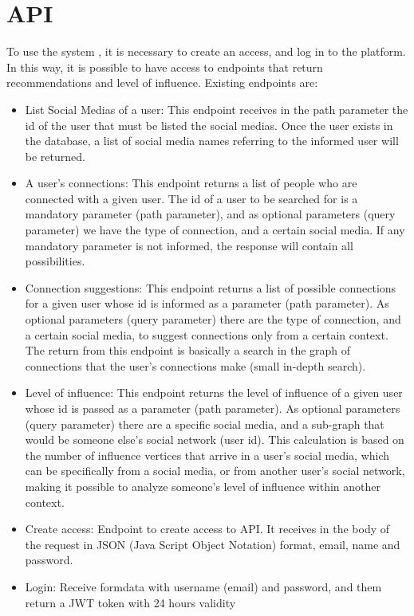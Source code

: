 
\section{API}
To use the system \cite{MetaSocialMediaAPI}, it is necessary to create an access, and log in to the platform. In this way, it is possible to have access to endpoints that return recommendations and level of influence. Existing endpoints are:
\begin{itemize}
    \item List Social Medias of a user: This endpoint receives in the path parameter the id of the user that must be listed the social medias. Once the user exists in the database, a list of social media names referring to the informed user will be returned.
    \item A user's connections: This endpoint returns a list of people who are connected with a given user. The id of a user to be searched for is a mandatory parameter (path parameter), and as optional parameters (query parameter) we have the type of connection, and a certain social media. If any mandatory parameter is not informed, the response will contain all possibilities.
    \item Connection suggestions: This endpoint returns a list of possible connections for a given user whose id is informed as a parameter (path parameter). As optional parameters (query parameter) there are the type of connection, and a certain social media, to suggest connections only from a certain context. The return from this endpoint is basically a search in the graph of connections that the user's connections make (small in-depth search).
    \item Level of influence: This endpoint returns the level of influence of a given user whose id is passed as a parameter (path parameter). As optional parameters (query parameter) there are a specific social media, and a sub-graph that would be someone else's social network (user id). This calculation is based on the number of influence vertices that arrive in a user's social media, which can be specifically from a social media, or from another user's social network, making it possible to analyze someone's level of influence within another context.
    \item Create access: Endpoint to create access to API. It receives in the body of the request in JSON (Java Script Object Notation) format, email, name and password.
    \item Login: Receive formdata with username (email) and password, and them return a JWT token with 24 hours validity
\end{itemize}






